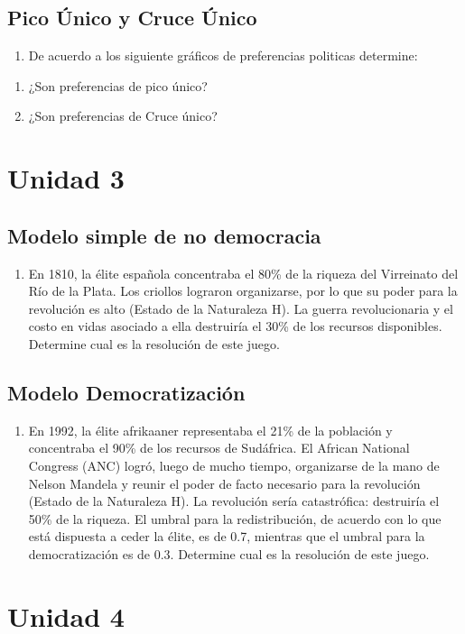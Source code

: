 \documentclass[
  letterpaper,
  DIV=11,
  numbers=noendperiod]{scrartcl}
\providecommand{\tightlist}{%
  \setlength{\itemsep}{0pt}\setlength{\parskip}{0pt}}
\begin{document}
\subsection{Pico Único y Cruce Único}\label{2_3}

\begin{enumerate}
\def\labelenumi{\arabic{enumi})}
\setcounter{enumi}{6}
\tightlist
\item
  De acuerdo a los siguiente gráficos de preferencias politicas
  determine:
\end{enumerate}

\begin{enumerate}
\def\labelenumi{\alph{enumi})}
\tightlist
\item
  ¿Son preferencias de pico único?
\item
  ¿Son preferencias de Cruce único?
\end{enumerate}

\newpage

\section{Unidad 3}\label{3}

\subsection{Modelo simple de no democracia}\label{3_1}

\begin{enumerate}
\def\labelenumi{\arabic{enumi})}
\setcounter{enumi}{7}
\tightlist
\item
  En 1810, la élite española concentraba el 80\% de la riqueza del
  Virreinato del Río de la Plata. Los criollos lograron organizarse, por
  lo que su poder para la revolución es alto (Estado de la Naturaleza
  H). La guerra revolucionaria y el costo en vidas asociado a ella
  destruiría el 30\% de los recursos disponibles. Determine cual es la
  resolución de este juego.
\end{enumerate}

\subsection{Modelo Democratización}\label{3_2}

\begin{enumerate}
\def\labelenumi{\arabic{enumi})}
\setcounter{enumi}{8}
\tightlist
\item
  En 1992, la élite afrikaaner representaba el 21\% de la población y
  concentraba el 90\% de los recursos de Sudáfrica. El African National
  Congress (ANC) logró, luego de mucho tiempo, organizarse de la mano de
  Nelson Mandela y reunir el poder de facto necesario para la revolución
  (Estado de la Naturaleza H). La revolución sería catastrófica:
  destruiría el 50\% de la riqueza. El umbral para la redistribución, de
  acuerdo con lo que está dispuesta a ceder la élite, es de 0.7,
  mientras que el umbral para la democratización es de 0.3. Determine
  cual es la resolución de este juego.
\end{enumerate}

\newpage

\section{Unidad 4}\label{4}
\end{document}
